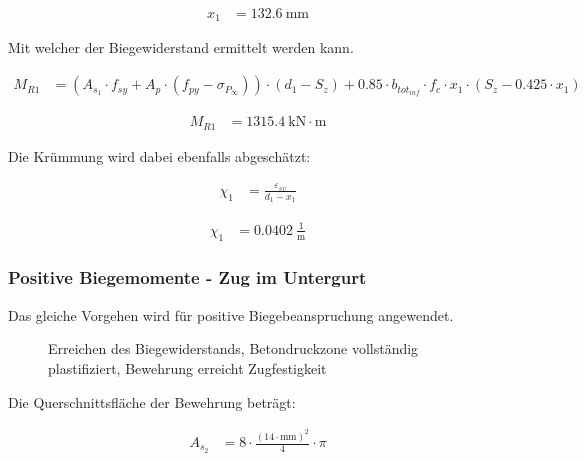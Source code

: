 \documentclass[
  11pt,
  letterpaper,
]{scrreprt}
\begin{document}
$$
\begin{aligned}
x_{1} &= 132.6\ \mathrm{mm} \;
\end{aligned}
$$

Mit welcher der Biegewiderstand ermittelt werden kann.

$$
\begin{aligned}
M_{R1} &= \left( A_{s_{1}} \cdot f_{sy} + A_{p} \cdot \left( f_{py} - \sigma_{P_{\infty}} \right) \right) \cdot \left( d_{1} - S_{z} \right) + 0.85 \cdot b_{tot_{inf}} \cdot f_{c} \cdot x_{1} \cdot \left( S_{z} - 0.425 \cdot x_{1} \right) \; 
\end{aligned}
$$

$$
\begin{aligned}
M_{R1} &= 1315.4\ \mathrm{kN} \cdot \mathrm{m} \;
\end{aligned}
$$

Die Krümmung wird dabei ebenfalls abgeschätzt:

$$
\begin{aligned}
\chi_{1} &= \frac{ \varepsilon_{sv} }{ d_{1} - x_{1} } \; 
\end{aligned}
$$

$$
\begin{aligned}
\chi_{1} &= 0.0402\ \frac{1}{\mathrm{m}} \;
\end{aligned}
$$

\subsubsection{Positive Biegemomente - Zug im
Untergurt}\label{positive-biegemomente---zug-im-untergurt}

Das gleiche Vorgehen wird für positive Biegebeanspruchung angewendet.

\begin{figure}[H]


\caption{\label{fig-t6_qs_MR_pos}Erreichen des Biegewiderstands,
Betondruckzone vollständig plastifiziert, Bewehrung erreicht
Zugfestigkeit}

\end{figure}%

Die Querschnittsfläche der Bewehrung beträgt:

$$
\begin{aligned}
A_{s_{2}} &= 8 \cdot \frac{ \left( 14 \cdot \mathrm{mm} \right) ^{ 2 } }{ 4 } \cdot \pi \; 
\end{aligned}
$$
\end{document}
